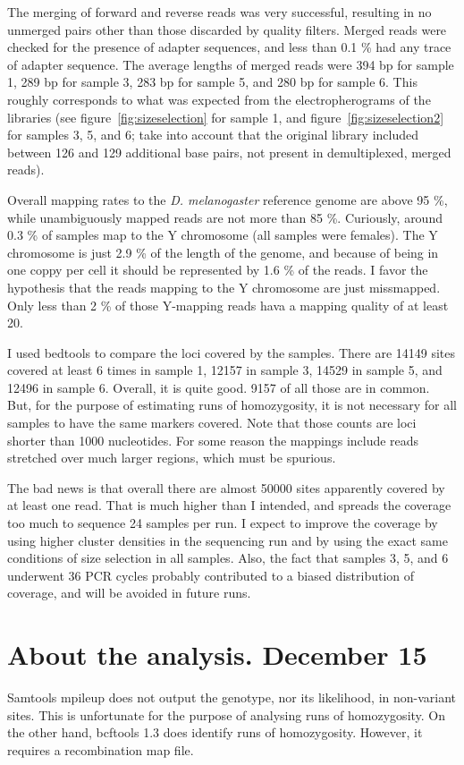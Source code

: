 \documentclass[a4paper,12pt]{article}
\begin{document}
The merging of forward and reverse reads was very successful, resulting in no unmerged pairs other than those discarded by quality filters. Merged reads were checked for the presence of adapter sequences, and less than 0.1 \% had any trace of adapter sequence. The average lengths of merged reads were 394 bp for sample 1, 289 bp for sample 3, 283 bp for sample 5, and 280 bp for sample 6. This roughly corresponds to what was expected from the electropherograms of the libraries (see figure~\ref{fig:sizeselection} for sample 1, and figure~\ref{fig:sizeselection2} for samples 3, 5, and 6; take into account that the original library included between 126 and 129 additional base pairs, not present in demultiplexed, merged reads).

Overall mapping rates to the \emph{D. melanogaster} reference genome are above 95 \%, while unambiguously mapped reads are not more than 85 \%. Curiously, around 0.3 \% of samples map to the Y chromosome (all samples were females). The Y chromosome is just 2.9 \% of the length of the genome, and because of being in one coppy per cell it should be represented by 1.6 \% of the reads. I favor the hypothesis that the reads mapping to the Y chromosome are just missmapped. Only less than 2 \% of those Y-mapping reads hava a mapping quality of at least 20.

I used bedtools to compare the loci covered by the samples. There are 14149 sites covered at least 6 times in sample 1, 12157 in sample 3, 14529 in sample 5, and 12496 in sample 6. Overall, it is quite good. 9157 of all those are in common. But, for the purpose of estimating runs of homozygosity, it is not necessary for all samples to have the same markers covered. Note that those counts are loci shorter than 1000 nucleotides. For some reason the mappings include reads stretched over much larger regions, which must be spurious.

The bad news is that overall there are almost 50000 sites apparently covered by at least one read. That is much higher than I intended, and spreads the coverage too much to sequence 24 samples per run. I expect to improve the coverage by using higher cluster densities in the sequencing run and by using the exact same conditions of size selection in all samples. Also, the fact that samples 3, 5, and 6 underwent 36 PCR cycles probably contributed to a biased distribution of coverage, and will be avoided in future runs.

\section{About the analysis. December 15}
Samtools mpileup does not output the genotype, nor its likelihood, in non-variant sites. This is unfortunate for the purpose of analysing runs of homozygosity. On the other hand, bcftools 1.3 does identify runs of homozygosity. However, it requires a recombination map file.
\end{document}
